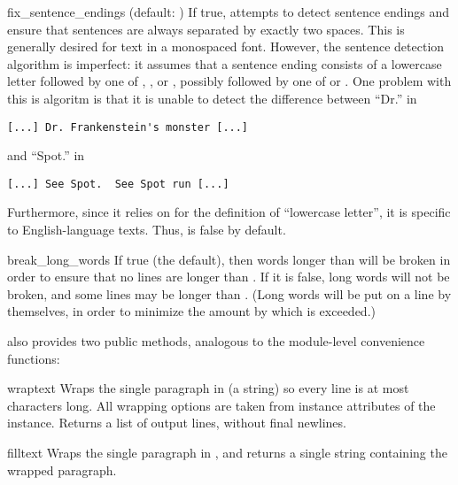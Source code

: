 \begin{memberdesc}{fix_sentence_endings}
(default: ) If true,  attempts to detect
sentence endings and ensure that sentences are always separated by
exactly two spaces.  This is generally desired for text in a monospaced
font.  However, the sentence detection algorithm is imperfect: it
assumes that a sentence ending consists of a lowercase letter followed
by one of ,
\character{!}, or , possibly followed by one of
 or .  One problem with this is algoritm is
that it is unable to detect the difference between ``Dr.'' in
\begin{verbatim}
[...] Dr. Frankenstein's monster [...]
\end{verbatim}
and ``Spot.'' in
\begin{verbatim}
[...] See Spot.  See Spot run [...]
\end{verbatim}
Furthermore, since it relies on  for the
definition of ``lowercase letter'', it is specific to English-language
texts.  Thus,  is false by default.
\end{memberdesc}

\begin{memberdesc}{break_long_words}
If true (the default), then words longer than  will be broken
in order to ensure that no lines are longer than .  If it is
false, long words will not be broken, and some lines may be longer than
.  (Long words will be put on a line by themselves, in order
to minimize the amount by which  is exceeded.)
\end{memberdesc}

 also provides two public methods, analogous to the
module-level convenience functions:

\begin{methoddesc}{wrap}{text}
Wraps the single paragraph in  (a string) so every line is at
most  characters long.  All wrapping options are taken from
instance attributes of the  instance.  Returns a list
of output lines, without final newlines.
\end{methoddesc}

\begin{methoddesc}{fill}{text}
Wraps the single paragraph in , and returns a single string
containing the wrapped paragraph.
\end{methoddesc}
